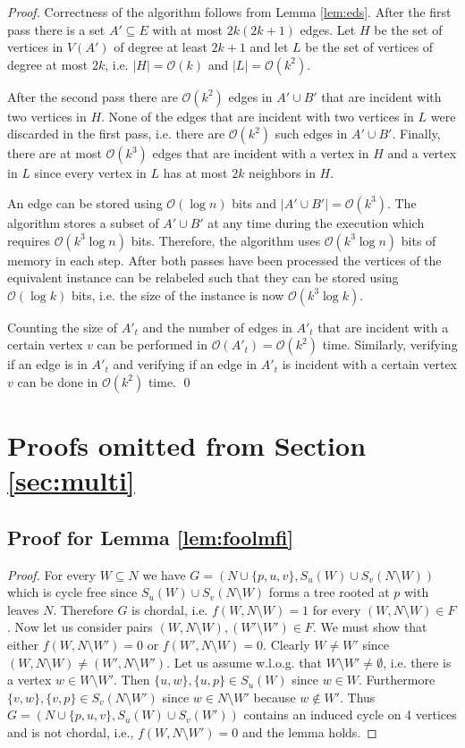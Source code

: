 \documentclass[draft,a4paper]{llncs}
\newcommand{\Oh}{\mathcal{O}}
\begin{document}
\begin{proof}
 Correctness of the algorithm follows from Lemma \ref{lem:eds}. After the first pass there is a set $A' \subseteq E$ with at most
 $2k(2k+1)$ edges. Let $H$ be the set of vertices in $V(A')$ of degree at least $2k+1$ and let $L$ be the set of vertices of degree at most $2k$, i.e. $|H| = \Oh(k)$ and $|L| = \Oh(k^2)$.
 
 After the second pass there are $\Oh(k^2)$ edges in $A' \cup B'$ that are incident with two vertices in $H$. None of the edges that are incident with two vertices in $L$ were discarded in the first pass, i.e. there are $\Oh(k^2)$ such edges in $A' \cup B'$. Finally, there are at most $\Oh(k^3)$ edges that are incident with a vertex in $H$ and a vertex in $L$ since every vertex in $L$ has at most $2k$ neighbors in $H$.
 
 An edge can be stored using $\Oh(\log n)$ bits and  $|A' \cup B'| = \Oh(k^3)$. The algorithm stores a subset of $A' \cup B'$ at any time during the execution which requires $\Oh(k^3 \log n)$ bits. Therefore, the algorithm uses $\Oh(k^3 \log n)$ bits of memory in each step. After both passes have been processed the vertices of the equivalent instance can be relabeled such that they can be stored using $\Oh(\log k)$ bits, i.e. the size of the instance is now $\Oh(k^3 \log k)$. 
 
 Counting the size of $A'_t$ and the number of edges in $A'_t$ that are incident with a certain vertex $v$ can be performed in $\Oh(A'_t) = \Oh(k^2)$ time. Similarly, verifying if an edge is in $A'_t$ and verifying if an edge in $A'_t$ is incident with a certain vertex $v$ can be done in $\Oh(k^2)$ time.
  \qed \end{proof}
  
\section{Proofs omitted from Section \ref{sec:multi}}
\subsection{Proof for Lemma \ref{lem:foolmfi}}

\begin{proof}
For every $W \subseteq N$ we have $G = (N \cup \{p, u, v\}, S_u(W) \cup S_v(N\setminus W))$ which is cycle free since $S_u(W) \cup S_v(N \setminus W)$ forms a tree rooted at $p$ with leaves $N$. Therefore $G$ is chordal, i.e. $f(W, N \setminus W) = 1$ for every $(W, N \setminus W) \in F$. Now let us consider pairs $(W, N \setminus W), (W' \setminus W') \in F$. We must show that either $f(W, N \setminus W') = 0$ or $f(W', N \setminus W) = 0$. Clearly $W \neq W'$ since $(W, N \setminus W) \neq (W', N \setminus W')$. Let us assume w.l.o.g. that $W \setminus W' \neq \emptyset$, i.e. there is a vertex $w \in W \setminus W'$. Then $\{u, w\}, \{u, p\} \in S_u(W)$ since $w \in W$. Furthermore $\{v, w\}, \{v, p\} \in S_v(N\setminus W')$ since $w \in N \setminus W'$ because $w \notin W'$. Thus $G = (N \cup \{p, u, v\}, S_u(W) \cup S_v(W'))$ contains an induced cycle on 4 vertices and is not chordal, i.e., $f(W, N \setminus W') = 0$ and the lemma holds.
\end{proof}
\end{document}
